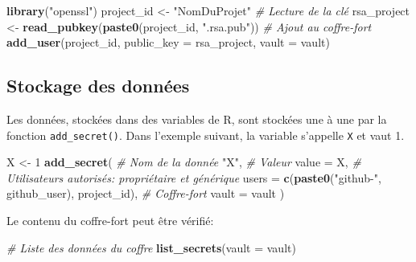 \documentclass[
  12pt,
  french,
  a4paper,
  extrafontsizes,onecolumn,openright
  ]{memoir}
\newenvironment{Shaded}{\begin{snugshade}}{\end{snugshade}}
\newcommand{\AttributeTok}[1]{\textcolor[rgb]{0.13,0.29,0.53}{#1}}
\newcommand{\CommentTok}[1]{\textcolor[rgb]{0.56,0.35,0.01}{\textit{#1}}}
\newcommand{\DecValTok}[1]{\textcolor[rgb]{0.00,0.00,0.81}{#1}}
\newcommand{\FunctionTok}[1]{\textcolor[rgb]{0.13,0.29,0.53}{\textbf{#1}}}
\newcommand{\NormalTok}[1]{#1}
\newcommand{\OtherTok}[1]{\textcolor[rgb]{0.56,0.35,0.01}{#1}}
\newcommand{\StringTok}[1]{\textcolor[rgb]{0.31,0.60,0.02}{#1}}
\begin{document}
\scriptsize

\begin{Shaded}
\begin{Highlighting}[]
\FunctionTok{library}\NormalTok{(}\StringTok{"openssl"}\NormalTok{)}
\NormalTok{project\_id }\OtherTok{\textless{}{-}} \StringTok{"NomDuProjet"}
\CommentTok{\# Lecture de la clé}
\NormalTok{rsa\_project }\OtherTok{\textless{}{-}} \FunctionTok{read\_pubkey}\NormalTok{(}\FunctionTok{paste0}\NormalTok{(project\_id, }\StringTok{".rsa.pub"}\NormalTok{))}
\CommentTok{\# Ajout au coffre{-}fort}
\FunctionTok{add\_user}\NormalTok{(project\_id, }\AttributeTok{public\_key =}\NormalTok{ rsa\_project, }\AttributeTok{vault =}\NormalTok{ vault)}
\end{Highlighting}
\end{Shaded}

\normalsize

\subsection{Stockage des données}\label{stockage-des-donnuxe9es}

Les données, stockées dans des variables de R, sont stockées une à une par la fonction \texttt{add\_secret()}.
Dans l'exemple suivant, la variable s'appelle \texttt{X} et vaut 1.

\scriptsize

\begin{Shaded}
\begin{Highlighting}[]
\NormalTok{X }\OtherTok{\textless{}{-}} \DecValTok{1}
\FunctionTok{add\_secret}\NormalTok{(}
  \CommentTok{\# Nom de la donnée}
  \StringTok{"X"}\NormalTok{, }
  \CommentTok{\# Valeur}
  \AttributeTok{value =}\NormalTok{ X, }
  \CommentTok{\# Utilisateurs autorisés: propriétaire et générique}
  \AttributeTok{users =} \FunctionTok{c}\NormalTok{(}\FunctionTok{paste0}\NormalTok{(}\StringTok{"github{-}"}\NormalTok{, github\_user), project\_id), }
  \CommentTok{\# Coffre{-}fort}
  \AttributeTok{vault =}\NormalTok{ vault}
\NormalTok{)}
\end{Highlighting}
\end{Shaded}

\normalsize

Le contenu du coffre-fort peut être vérifié:

\scriptsize

\begin{Shaded}
\begin{Highlighting}[]
\CommentTok{\# Liste des données du coffre}
\FunctionTok{list\_secrets}\NormalTok{(}\AttributeTok{vault =}\NormalTok{ vault)}
\end{Highlighting}
\end{Shaded}
\end{document}
